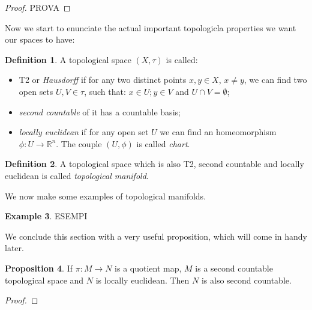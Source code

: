 \documentclass[12pt,a4paper]{report}
\theoremstyle{definition}
\newtheorem{Def}{Definition}[chapter]
\theoremstyle{Theorem}
\newtheorem{Prop}[Def]{Proposition}
\theoremstyle{definition}
\newtheorem{Ex}[Def]{Example}
\theoremstyle{definition}
\begin{document}
			\begin{proof}
				PROVA
			\end{proof}
			Now we start to enunciate the actual important topologicla properties we want our spaces to have:
			\begin{Def}
				A topological space $(X,\tau)$ is called:
				\begin{itemize}
					\item T2 or \textit{Hausdorff} if for any two distinct points $x,y\in X$, $x\neq y$, we can find two open sets $U,V\in \tau$, such that: $x\in U;y\in V$ and $U\cap V=\emptyset$;
					\item \textit{second countable} of it has a countable basis;
					\item \textit{locally euclidean} if for any open set $U$ we can find an homeomorphism $\phi:U\rightarrow \mathbb{R}^n$. The couple $(U,\phi)$ is called \textit{chart}.	
				\end{itemize}
			\end{Def}
			\begin{Def}
				A topological space which is also T2, second countable and locally euclidean is called \textit{topological manifold}.
			\end{Def}
			We now make some examples of topological manifolds.
			\begin{Ex}
				ESEMPI
			\end{Ex}
			We conclude this section with a very useful proposition, which will come in handy later.
			\begin{Prop}
				If $\pi:M\rightarrow N$ is a quotient map, $M$ is a second countable topological space and $N$ is locally euclidean. Then $N$ is also second countable.
			\end{Prop}
			\begin{proof}
				
			\end{proof}
\end{document}
